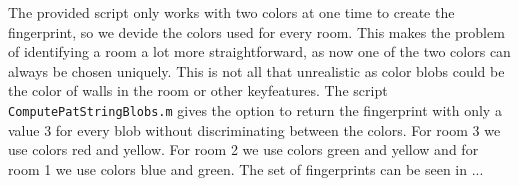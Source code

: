 \documentclass[a4paper, 20pt]{article}
\begin{document}
\begin{figure}[!ht]
\centering
\begin{floatrow}
  
\end{floatrow}
\end{figure}

The provided script only works with two colors at one time to create the
fingerprint, so we devide the colors used for every room. This makes the problem
of identifying a room
a lot more straightforward, as now one of the two colors can always be chosen
uniquely. This is not all that unrealistic as color blobs could be the color of
walls in the room or other keyfeatures. The script \texttt{ComputePatStringBlobs.m} gives the option to return
the fingerprint with only a value 3 for every blob without discriminating
between
the colors.
For room 3 we use colors red and yellow. For room 2 we use colors green and
yellow and for room 1 we use colors blue and green. The set of fingerprints can
be seen in ...
\end{document}
